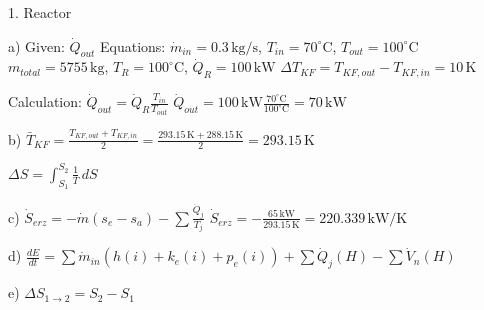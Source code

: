 1. Reactor  

a)  
Given: \( \dot{Q}_{out} \)  
Equations:  
\( \dot{m}_{in} = 0.3 \, \text{kg/s} \), \( T_{in} = 70^\circ \text{C} \), \( T_{out} = 100^\circ \text{C} \)  
\( m_{total} = 5755 \, \text{kg} \), \( T_R = 100^\circ \text{C} \), \( \dot{Q}_R = 100 \, \text{kW} \)  
\( \Delta T_{KF} = T_{KF,out} - T_{KF,in} = 10 \, \text{K} \)  

Calculation:  
\( \dot{Q}_{out} = \dot{Q}_R \frac{T_{in}}{T_{out}} \)  
\( \dot{Q}_{out} = 100 \, \text{kW} \frac{70^\circ \text{C}}{100^\circ \text{C}} = 70 \, \text{kW} \)  

b)  
\( \bar{T}_{KF} = \frac{T_{KF,out} + T_{KF,in}}{2} = \frac{293.15 \, \text{K} + 288.15 \, \text{K}}{2} = 293.15 \, \text{K} \)  

\( \Delta S = \int_{S_1}^{S_2} \frac{1}{T} \, dS \)  

c)  
\( \dot{S}_{erz} = -\dot{m}(s_e - s_a) - \sum \frac{\dot{Q}_j}{T_j} \)  
\( \dot{S}_{erz} = -\frac{65 \, \text{kW}}{293.15 \, \text{K}} = 220.339 \, \text{kW/K} \)  

d)  
\( \frac{dE}{dt} = \sum \dot{m}_{in}(h(i) + k_e(i) + p_e(i)) + \sum \dot{Q}_j(H) - \sum \dot{V}_n(H) \)  

e)  
\( \Delta S_{1 \to 2} = S_2 - S_1 \)
